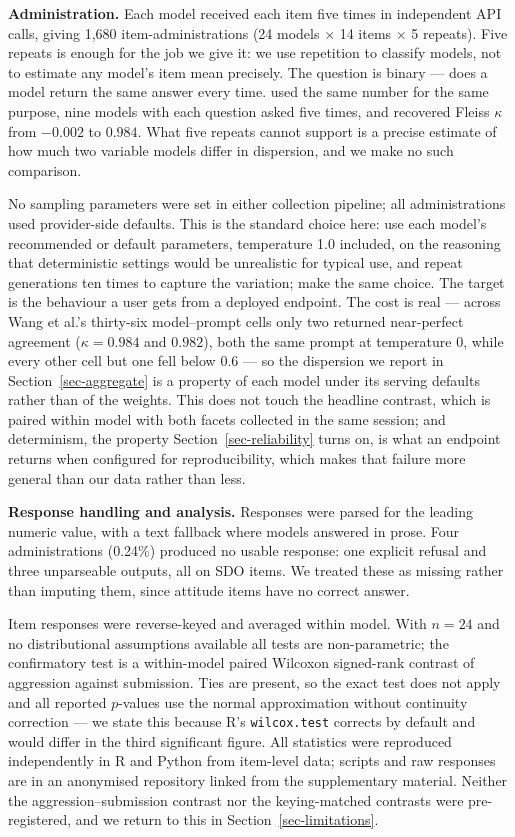 \documentclass{article}
\begin{document}
\textbf{Administration.} Each model received each item five times in
independent API calls, giving 1,680 item-administrations (24 models
\(\times\) 14 items \(\times\) 5 repeats). Five repeats is enough for
the job we give it: we use repetition to classify models, not to
estimate any model's item mean precisely. The question is binary ---
does a model return the same answer every time. \citet{wang2024} used
the same number for the same purpose, nine models with each question
asked five times, and recovered Fleiss \(\kappa\) from \(-0.002\) to
\(0.984\). What five repeats cannot support is a precise estimate of how
much two variable models differ in dispersion, and we make no such
comparison.

No sampling parameters were set in either collection pipeline; all
administrations used provider-side defaults. This is the standard choice
here: \citet{einwiller2026} use each model's recommended or default
parameters, temperature 1.0 included, on the reasoning that
deterministic settings would be unrealistic for typical use, and repeat
generations ten times to capture the variation; \citet{urban2025} make
the same choice. The target is the behaviour a user gets from a deployed
endpoint. The cost is real --- across Wang et al.'s thirty-six
model--prompt cells only two returned near-perfect agreement
(\(\kappa = 0.984\) and \(0.982\)), both the same prompt at temperature
0, while every other cell but one fell below \(0.6\) --- so the
dispersion we report in Section~\ref{sec-aggregate} is a property of
each model under its serving defaults rather than of the weights. This
does not touch the headline contrast, which is paired within model with
both facets collected in the same session; and determinism, the property
Section~\ref{sec-reliability} turns on, is what an endpoint returns when
configured for reproducibility, which makes that failure more general
than our data rather than less.

\textbf{Response handling and analysis.} Responses were parsed for the
leading numeric value, with a text fallback where models answered in
prose. Four administrations (0.24\%) produced no usable response: one
explicit refusal and three unparseable outputs, all on SDO items. We
treated these as missing rather than imputing them, since attitude items
have no correct answer.

Item responses were reverse-keyed and averaged within model. With
\(n = 24\) and no distributional assumptions available all tests are
non-parametric; the confirmatory test is a within-model paired Wilcoxon
signed-rank contrast of aggression against submission. Ties are present,
so the exact test does not apply and all reported \(p\)-values use the
normal approximation without continuity correction --- we state this
because R's \texttt{wilcox.test} corrects by default and would differ in
the third significant figure. All statistics were reproduced
independently in R and Python from item-level data; scripts and raw
responses are in an anonymised repository linked from the supplementary
material. Neither the aggression--submission contrast nor the
keying-matched contrasts were pre-registered, and we return to this in
Section~\ref{sec-limitations}.
\end{document}
